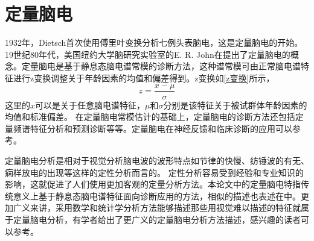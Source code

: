 \section{定量脑电}
1932年，\cite{Dietsch1932}Dietsch首次使用傅里叶变换分析七例头表脑电，这是定量脑电的开始。
19世纪80年代，美国纽约大学脑研究实验室的E. R. John在\cite{john1977neurometrics,john1980developmental}提出了定量脑电的概念。定量脑电是基于静息态脑电谱常模的诊断方法，这种谱常模可由正常脑电谱特征进行z变换调整关于年龄因素的均值和偏差得到。z变换如\eqref{z变换}所示，
\begin{equation*}\label{z变换}
z=\frac{x-\mu}{\sigma}
\end{equation*}
这里的$x$可以是关于任意脑电谱特征，$\mu$和$\sigma$分别是该特征关于被试群体年龄因素的均值和标准偏差。
在定量脑电常模估计的基础上，定量脑电的诊断方法还包括定量频谱特征分析和预测诊断等等。定量脑电在神经反馈和临床诊断的应用可以参考\cite{budzynski2009introduction,simkin2014quantitative}。

定量脑电分析是相对于视觉分析脑电波的波形特点如节律的快慢、纺锤波的有无、痫样放电的出现等这样的定性分析而言的。 定性分析容易受到经验和专业知识的影响，这就促进了人们使用更加客观的定量分析方法。本论文中的定量脑电特指传统意义上基于静息态脑电谱特征面向诊断应用的方法，相似的描述也表述在\cite{kropotov2010quantitative,evans1999introduction,nuwer1988quantitative}中。更加广义来讲，采用数学和统计学分析方法能够描述那些用视觉难以描述的特征就属于定量脑电分析，有学者给出了更广义的定量脑电分析方法描述，感兴趣的读者可以参考\cite{tong2009quantitative,majumdar2017brief}。

